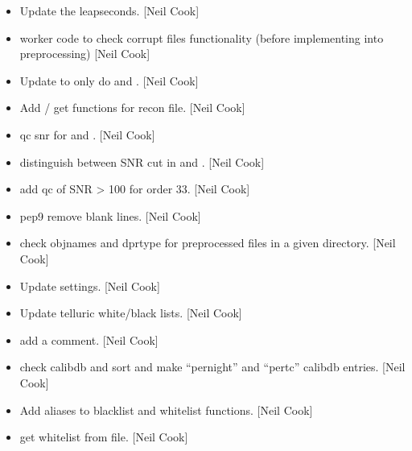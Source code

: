 \documentclass[a4paper,10pt,english]{report}
\begin{document}
\label{\detokenize{misc/changelog:id210}}\begin{itemize}
\item {} 
Update the leapseconds. {[}Neil Cook{]}

\item {} 
 \sphinxhyphen{} worker code to check corrupt files
functionality (before implementing into preprocessing) {[}Neil Cook{]}

\item {} 
Update to only do  and . {[}Neil Cook{]}

\item {} 
Add  / get functions for recon file. {[}Neil Cook{]}

\item {} 
 \sphinxhyphen{} qc snr for  and . {[}Neil
Cook{]}

\item {} 
 \sphinxhyphen{} distinguish between SNR cut in  and
. {[}Neil Cook{]}

\item {} 
 \sphinxhyphen{} add qc of SNR \textgreater{} 100 for order 33. {[}Neil Cook{]}

\item {} 
 \sphinxhyphen{} pep9 remove blank lines. {[}Neil Cook{]}

\item {} 
 \sphinxhyphen{} check objnames and dprtype for preprocessed files
in a given directory. {[}Neil Cook{]}

\item {} 
Update  settings. {[}Neil Cook{]}

\item {} 
Update telluric white/black lists. {[}Neil Cook{]}

\item {} 
 \sphinxhyphen{} add a comment. {[}Neil Cook{]}

\item {} 
 \sphinxhyphen{} check calibdb and sort and make “pernight” and
“pertc” calibdb entries. {[}Neil Cook{]}

\item {} 
 \sphinxhyphen{} Add aliases to blacklist and whitelist
functions. {[}Neil Cook{]}

\item {} 
 \sphinxhyphen{} get whitelist from file. {[}Neil Cook{]}

\end{itemize}
\end{document}
